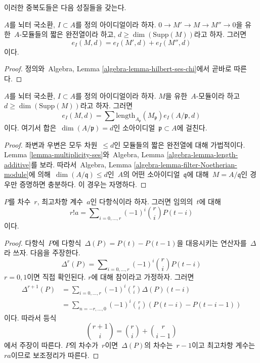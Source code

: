 \noindent
이러한 중복도들은 다음 성질들을 갖는다.

\begin{lemma}
\label{lemma-multiplicity-ses}
$A$를 뇌터 국소환, $I \subset A$를 정의 아이디얼이라 하자.
$0 \to M' \to M \to M'' \to 0$을 유한\  $A$-모듈들의 짧은 완전열이라 하고,
$d \geq \dim(\text{Supp}(M))$라고 하자. 그러면
$$
e_I(M, d) = e_I(M', d) + e_I(M'', d)
$$
이다.
\end{lemma}

\begin{proof}
정의와\  Algebra, Lemma \ref{algebra-lemma-hilbert-ses-chi}에서 곧바로 따른다.
\end{proof}

\begin{lemma}
\label{lemma-multiplicity-as-a-sum}
$A$를 뇌터 국소환, $I \subset A$를 정의 아이디얼이라 하자.
$M$을 유한\  $A$-모듈이라 하고\  $d \geq \dim(\text{Supp}(M))$라고 하자.
그러면
$$
e_I(M, d) =
\sum \text{length}_{A_\mathfrak p}(M_\mathfrak p) e_I(A/\mathfrak p, d)
$$
이다. 여기서 합은\  $\dim(A/\mathfrak p) = d$인 소아이디얼\ 
$\mathfrak p \subset A$에 걸친다.
\end{lemma}

\begin{proof}
좌변과 우변은 모두 차원\  $\leq d$인 모듈들의 짧은 완전열에 대해 가법적이다.
Lemma \ref{lemma-multiplicity-ses}와\ 
Algebra, Lemma \ref{algebra-lemma-length-additive}를 보라.
따라서\  Algebra, Lemma
\ref{algebra-lemma-filter-Noetherian-module}에 의해\ 
$\dim(A/\mathfrak q) \leq d$인\  $A$의 어떤 소아이디얼\  $\mathfrak q$에 대해\ 
$M = A/\mathfrak q$인 경우만 증명하면 충분하다.
이 경우는 자명하다.
\end{proof}

\begin{lemma}
\label{lemma-leading-coefficient}
$P$를 차수\  $r$, 최고차항 계수\  $a$인 다항식이라 하자. 그러면 임의의\ 
$t$에 대해
$$
r! a = \sum\nolimits_{i = 0, \ldots, r} (-1)^i{r \choose i} P(t - i)
$$
이다.
\end{lemma}

\begin{proof}
다항식\  $P$에 다항식\  $\Delta(P) = P(t) - P(t - 1)$을 대응시키는 연산자를\ 
$\Delta$라 쓰자. 다음을 주장한다.
$$
\Delta^r(P) = \sum\nolimits_{i = 0, \ldots, r} (-1)^i {r \choose i} P(t - i)
$$
$r = 0, 1$이면 직접 확인된다. $r$에 대해 참이라고 가정하자. 그러면
\begin{align*}
\Delta^{r + 1}(P)
& =
\sum\nolimits_{i = 0, \ldots, r} (-1)^i {r \choose i} \Delta(P)(t - i) \\
& =
\sum\nolimits_{n = -r, \ldots, 0} (-1)^i {r \choose i}
(P(t - i) - P(t - i - 1))
\end{align*}
이다. 따라서 등식
$$
{r + 1 \choose i} = {r \choose i} + {r \choose i - 1}
$$
에서 주장이 따른다. $P$의 차수가\  $r$이면\  $\Delta(P)$의 차수는\ 
$r - 1$이고 최고차항 계수는\  $ra$이므로 보조정리가 따른다.
\end{proof}

